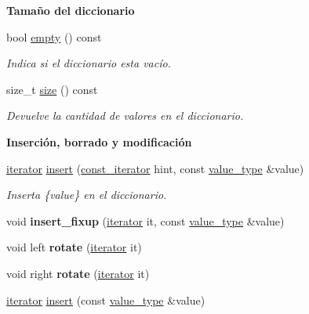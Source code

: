 \begin{Indent}\textbf{ Tamaño del diccionario}\par
\begin{DoxyCompactItemize}
\item 
bool \hyperlink{classaed2_1_1iterator_a7f98e1c0896c0d960a9dc020a0a4edb8}{empty} () const
\begin{DoxyCompactList}\small\item\em Indica si el diccionario esta vacío. \end{DoxyCompactList}\item 
size\+\_\+t \hyperlink{classaed2_1_1iterator_aa07bd4de2aeca4a6936fdbe9013be2ee}{size} () const
\begin{DoxyCompactList}\small\item\em Devuelve la cantidad de valores en el diccionario. \end{DoxyCompactList}\end{DoxyCompactItemize}
\end{Indent}
\begin{Indent}\textbf{ Inserción, borrado y modificación}\par
\begin{DoxyCompactItemize}
\item 
\hyperlink{classaed2_1_1iterator_1_1iterator}{iterator} \hyperlink{classaed2_1_1iterator_ab9446668ad5619115b6c4a10eac83d68}{insert} (\hyperlink{classaed2_1_1iterator_1_1const__iterator}{const\+\_\+iterator} hint, const \hyperlink{classaed2_1_1iterator_a6411a2c08b2b7c52f063bef1a168acb6}{value\+\_\+type} \&value)
\begin{DoxyCompactList}\small\item\em Inserta \{value\} en el diccionario. \end{DoxyCompactList}\item 
\mbox{\label{classaed2_1_1iterator_ab23378eb6149357e1a2167e9804eb6e3}} 
void {\bfseries insert\+\_\+fixup} (\hyperlink{classaed2_1_1iterator_1_1iterator}{iterator} it, const \hyperlink{classaed2_1_1iterator_a6411a2c08b2b7c52f063bef1a168acb6}{value\+\_\+type} \&value)
\item 
\mbox{\label{classaed2_1_1iterator_af4e447a081108196ecdf39b16ecb5303}} 
void left {\bfseries rotate} (\hyperlink{classaed2_1_1iterator_1_1iterator}{iterator} it)
\item 
\mbox{\label{classaed2_1_1iterator_a191eae4f3f076914ff1560a2fa833b70}} 
void right {\bfseries rotate} (\hyperlink{classaed2_1_1iterator_1_1iterator}{iterator} it)
\item 
\hyperlink{classaed2_1_1iterator_1_1iterator}{iterator} \hyperlink{classaed2_1_1iterator_aa1870e8bfa4f45c82fa1ee076846922b}{insert} (const \hyperlink{classaed2_1_1iterator_a6411a2c08b2b7c52f063bef1a168acb6}{value\+\_\+type} \&value)
\end{DoxyCompactItemize}
\end{Indent}
